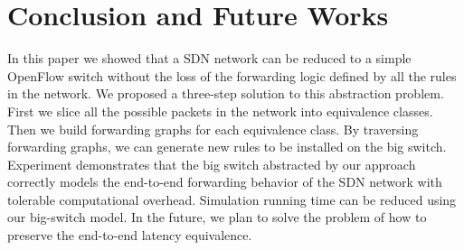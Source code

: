 \section{Conclusion and Future Works}

In this paper we showed that a SDN network can be reduced to a simple OpenFlow switch
without the loss of the forwarding logic defined by all the rules in the network.
We proposed a three-step solution to this abstraction problem.
First we slice all the possible packets in the network into equivalence classes.
Then we build forwarding graphs for each equivalence class.
By traversing forwarding graphs, we can generate new rules to be installed
on the big switch.
Experiment demonstrates that the big switch abstracted by our approach correctly models
the end-to-end forwarding behavior of the SDN network with tolerable computational overhead.
Simulation running time can be reduced using our big-switch model.
In the future, we plan to solve the problem of how to preserve the end-to-end latency
equivalence.

